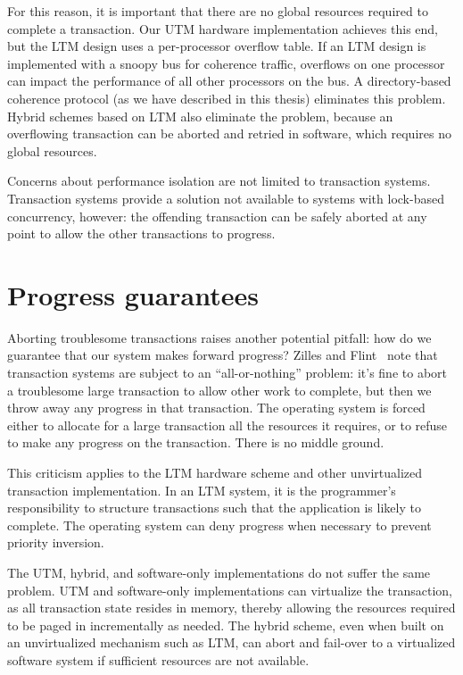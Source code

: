 For this reason, it is important that there are no global resources
required to complete a transaction.  Our UTM hardware implementation
achieves this end, but the LTM design uses a per-processor overflow
table.  If an LTM design is implemented with a snoopy bus for
coherence traffic, overflows on one processor can impact the
performance of all other processors on the bus.  A directory-based
coherence protocol (as we have described in this thesis) eliminates
this problem.  Hybrid schemes based on LTM also eliminate the problem,
because an overflowing transaction can be aborted and retried in
software, which requires no global resources.

Concerns about performance isolation are not limited to transaction
systems.  Transaction systems provide a solution not available to
systems with lock-based concurrency, however: the offending
transaction can be safely aborted at any point to allow the other
transactions to progress.

\section{Progress guarantees}\label{sec:progress}
Aborting troublesome transactions raises another potential pitfall:
how do we guarantee that our system makes forward progress?
Zilles and Flint~\cite{ZillesFl05} note that transaction systems are
subject to an ``all-or-nothing'' problem: it's fine to abort a
troublesome large transaction to allow other work to complete, but
then we throw away any progress in that transaction.  The operating
system is forced either to allocate for a large transaction all the
resources it requires, or to refuse to make any progress on the
transaction.  There is no middle ground.

This criticism applies to the LTM hardware scheme and other
unvirtualized transaction implementation.  In an LTM system, it is the
programmer's responsibility to structure transactions such that the
application is likely to complete.  The operating system can deny
progress when necessary to prevent priority inversion.

The UTM, hybrid, and software-only implementations do not suffer the
same problem.  UTM and software-only implementations can virtualize
the transaction, as all transaction state resides in memory, thereby allowing
the resources required to be paged in incrementally as
needed.  The hybrid scheme, even when built on an unvirtualized
mechanism such as LTM, can abort and fail-over to a virtualized
software system if sufficient resources are not available.

